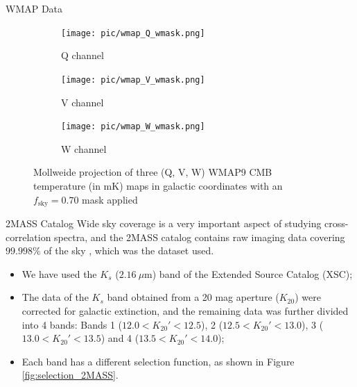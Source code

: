 \documentclass[serif, aspectratio=169]{beamer}
\begin{document}
\begin{frame}{WMAP Data}
    \begin{figure}
        \centering
        \begin{subfigure}[b]{0.32\linewidth}
            \texttt{[image: pic/wmap\_Q\_wmask.png]}
            \caption{Q channel}
            \label{fig:wmap_Q}
        \end{subfigure}
        \hfill
        \begin{subfigure}[b]{0.32\linewidth}
            \texttt{[image: pic/wmap\_V\_wmask.png]}
            \caption{V channel}
            \label{fig:wmap_V}
        \end{subfigure}
        \hfill
        \begin{subfigure}[b]{0.32\linewidth}
            \texttt{[image: pic/wmap\_W\_wmask.png]}
            \caption{W channel}
            \label{fig:wmap_W}
        \end{subfigure}
    \caption{Mollweide projection of three (Q, V, W) WMAP9 CMB temperature (in mK) maps in galactic coordinates with an $f_\text{sky}=0.70$ mask applied}
    \label{fig:wmap_maps}
    \end{figure}
\end{frame}

\begin{frame}{2MASS Catalog}
Wide sky coverage is a very important aspect of studying cross-correlation spectra, and the 2MASS catalog contains raw imaging data covering $99.998\%$ of the sky \cite{2MASS}, which was the dataset used. 

\begin{itemize}
	\item We have used the $K_s$ ($\SI{2.16}{\mu \meter}$) band of the Extended Source Catalog (XSC);
	\item The data of the $K_s$ band obtained from a 20 mag aperture ($K_{20}$) were corrected for galactic extinction, and the remaining data was further divided into 4 bands: Bands 1 ($12.0<K_{20}'<12.5$), 2 ($12.5<K_{20}'<13.0$), 3 ($13.0<K_{20}'<13.5$) and 4 ($13.5<K_{20}'<14.0$);
	\item Each band has a different selection function, as shown in Figure \ref{fig:selection_2MASS}.
\end{itemize}
\end{frame}
\end{document}
